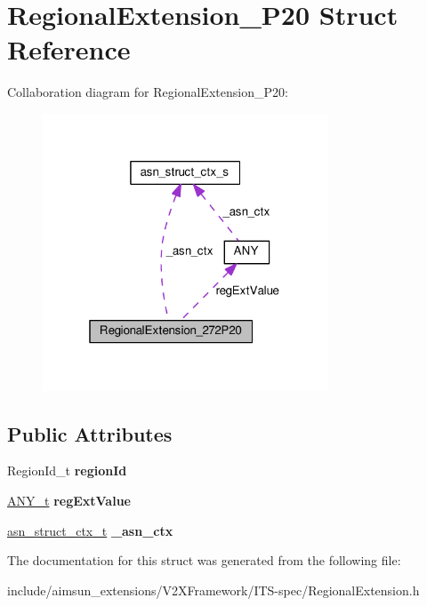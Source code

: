 \hypertarget{structRegionalExtension__272P20}{}\section{Regional\+Extension\+\_\+P20 Struct Reference}
\label{structRegionalExtension__272P20}


Collaboration diagram for Regional\+Extension\+\_\+P20\+:\nopagebreak
\begin{figure}[H]
\begin{center}
\leavevmode
\includegraphics[width=241pt]{structRegionalExtension__272P20__coll__graph}
\end{center}
\end{figure}
\subsection*{Public Attributes}
\begin{DoxyCompactItemize}
\item 
Region\+Id\+\_\+t {\bfseries region\+Id}\hypertarget{structRegionalExtension__272P20_abab4aa4f842806a94029d81f97a068ee}{}\label{structRegionalExtension__272P20_abab4aa4f842806a94029d81f97a068ee}

\item 
\hyperlink{structANY}{A\+N\+Y\+\_\+t} {\bfseries reg\+Ext\+Value}\hypertarget{structRegionalExtension__272P20_a4dd2d252c46d0e4c65397eeabcde5a7f}{}\label{structRegionalExtension__272P20_a4dd2d252c46d0e4c65397eeabcde5a7f}

\item 
\hyperlink{structasn__struct__ctx__s}{asn\+\_\+struct\+\_\+ctx\+\_\+t} {\bfseries \+\_\+asn\+\_\+ctx}\hypertarget{structRegionalExtension__272P20_a25d65d445c86dc327f14bfa438f32dc4}{}\label{structRegionalExtension__272P20_a25d65d445c86dc327f14bfa438f32dc4}

\end{DoxyCompactItemize}


The documentation for this struct was generated from the following file\+:\begin{DoxyCompactItemize}
\item 
include/aimsun\+\_\+extensions/\+V2\+X\+Framework/\+I\+T\+S-\/spec/Regional\+Extension.\+h\end{DoxyCompactItemize}
